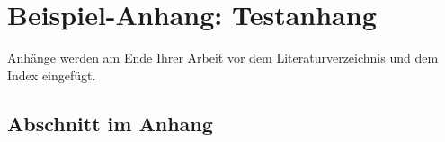 \chapter{Beispiel-Anhang: Testanhang}
Anh\"ange werden am Ende Ihrer Arbeit vor dem Literaturverzeichnis und dem Index eingef\"ugt.

\section{Abschnitt im Anhang}

\lipsum
